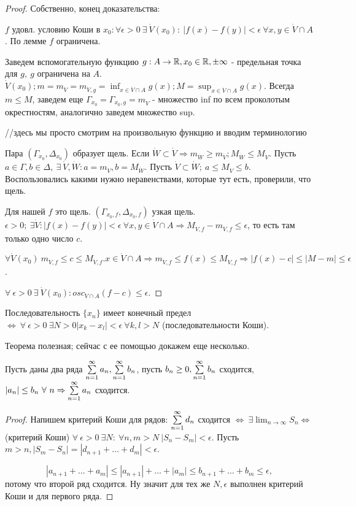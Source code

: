 \documentclass[12pt]{report}
\begin{document}
\begin{proof}
Собственно, конец доказательства:

$f$ удовл. условию Коши в $x_0: \forall \epsilon > 0 ~\exists ~\dot V(x_0): ~|f(x) - f(y)| < \epsilon ~\forall x, y \in \dot V\cap A$. По лемме $f$ ограничена. 

Заведем вспомогательную функцию $g: A \to \mathbb{R}, x_0 \in \mathbb{R}, \pm\infty$ - предельная точка для $g, ~g$ ограничена на $A$. $\dot V(x_0); m = m_{\dot V} = m_{\dot V, g} = \inf_{x \in \dot V \cap A}{g(x)}; M = \sup_{x \in \dot V \cap A}{g(x)}$. Всегда $m \le M$, заведем еще $\Gamma_{x_0} = \Gamma_{x_0, g} = {m_{\dot V}}$ - множество inf по всем проколотым окрестностям, аналогично заведем множество sup. 

//здесь мы просто смотрим на произвольную функцию и вводим терминологию

Пара $(\Gamma_{x_0}, \Delta_{x_0})$ образует щель. Если $\dot W \subset \dot V \Rightarrow m_{\dot W} \ge m_{\dot V}; M_{\dot W} \le M_{\dot V}$. Пусть $a \in \Gamma, b \in \Delta, ~\exists ~\dot V, \dot W: a = m_{\dot V}, b = M_{\dot W}$. Пусть $\dot V  \subset \dot W; ~a \le M_{\dot V} \le b$. Воспользовались какими нужно неравенствами, которые тут есть, проверили, что щель.

Для нашей $f$ это щель. $(\Gamma_{x_0, f}, \Delta_{x_0, f})$ узкая щель. $\epsilon > 0; ~\exists \dot V: |f(x) - f(y)| < \epsilon ~\forall x, y \in \dot V \cap A \Rightarrow M_{\dot V, f} - m_{\dot V, f} \le \epsilon$, то есть там только одно число $c$.

$\forall \dot V(x_0) ~m_{\dot V, f} \le c \le M_{\dot V, f}. x \in \dot V \cap A \Rightarrow m_{\dot V, f} \le f(x) \le M_{\dot V, f} \Rightarrow |f(x) - c| \le |M - m| \le \epsilon$.

$\forall ~\epsilon > 0 ~\exists ~\dot V(x_0): osc_{\dot V \cap A}(f - c) \le \epsilon$.
\end{proof}
\begin{cor}
Последовательность $\{x_n\}$ имеет конечный предел $\Leftrightarrow ~\forall ~\epsilon > 0 ~\exists N > 0 |x_k - x_l| < \epsilon ~\forall k, l > N$ (последовательности Коши).  
\end{cor}

Теорема полезная; сейчас с ее помощью докажем еще несколько.

\begin{thm}
Пусть даны два ряда $\sum\limits_{n = 1}^\infty{a_n}, \sum\limits_{n = 1}^\infty{b_n}$, пусть $b_n \ge 0, \sum\limits_{n = 1}^\infty{b_n}$ сходится, $|a_n| \le b_n ~\forall ~n \Rightarrow \sum\limits_{n = 1}^\infty{a_n}$ сходится.
\end{thm}
\begin{proof}
Напишем критерий Коши для рядов:
$\sum\limits_{n = 1}^\infty{d_n}$ сходится $\Leftrightarrow ~\exists \lim_{n \to \infty}{S_n} \Leftrightarrow$ (критерий Коши) $\forall ~\epsilon > 0 ~\exists N: ~\forall n, m > N ~|S_n - S_m| < \epsilon$.
Пусть $m > n, |S_m - S_n| = |d_{n + 1} + \dots + d_{m}| < \epsilon$. 

$$|a_{n + 1} + \dots + a_m| \le |a_{n + 1}| + \dots + |a_m| \le b_{n + 1} + \dots + b_m \le \epsilon,$$
потому что второй ряд сходится. Ну значит для тех же $N, \epsilon$ выполнен критерий Коши и для первого ряда.
\end{proof}
\end{document}
